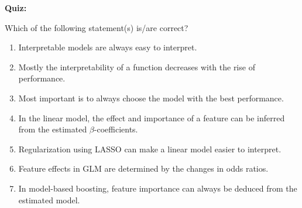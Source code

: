 \textbf{Quiz:}\\ \noindent
\vspace{0.1cm}

Which of the following statement(s) is/are correct?  
        	\begin{enumerate}
        	\item Interpretable models are always easy to interpret.
        	\item Mostly the interpretability of a function decreases with the rise of performance.
        	\item Most important is to always choose the model with the best performance.
        	\item In the linear model, the effect and importance of a feature can be inferred from the estimated $\beta$-coefficients.
        	\item Regularization using LASSO can make a linear model easier to interpret.
        	\item Feature effects in GLM are determined by the changes in odds ratios.
        	\item In model-based boosting, feature importance can always be deduced from the estimated model.
        \end{enumerate}